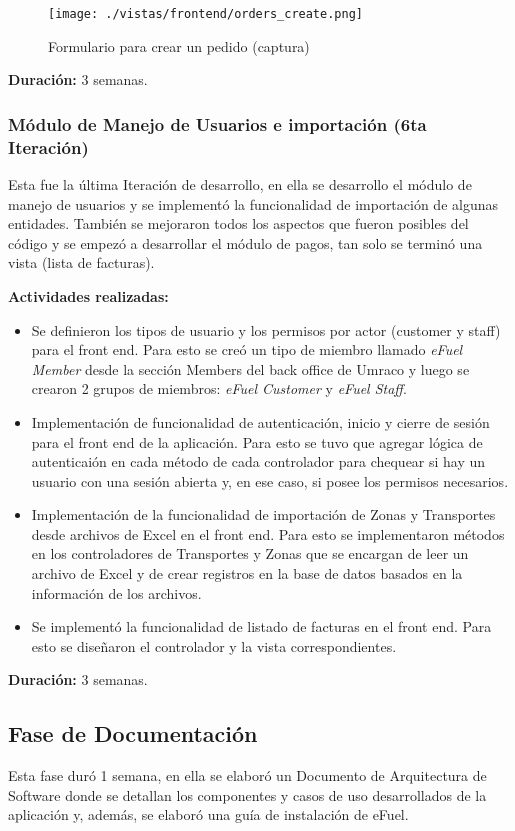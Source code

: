 \begin{figure}[H]
    \centering
    \texttt{[image: ./vistas/frontend/orders\_create.png]}
    \caption{Formulario para crear un pedido (captura)}
    \label{fig:ordercreate}
\end{figure}

\textbf{Duración:} 3 semanas.

\subsubsection{Módulo de Manejo de Usuarios e importación (6ta Iteración)}
Esta fue la última Iteración de desarrollo, en ella se desarrollo el módulo de manejo de usuarios y se implementó la funcionalidad de importación de algunas entidades. También se mejoraron todos los aspectos que fueron posibles del código y se empezó a desarrollar el módulo de pagos, tan solo se terminó una vista (lista de facturas).

\vspace{0.3cm}
\textbf{Actividades realizadas:}
\begin{itemize}
    \item Se definieron los tipos de usuario y los permisos por actor (customer y staff) para el front end. Para esto se creó un tipo de miembro llamado \emph{eFuel Member} desde la sección Members del back office de Umraco y luego se crearon 2 grupos de miembros: \emph{eFuel Customer} y \emph{eFuel Staff}.
    \item Implementación de funcionalidad de autenticación, inicio y cierre de sesión para el front end de la aplicación. Para esto se tuvo que agregar lógica de autenticaión en cada método de cada controlador para chequear si hay un usuario con una sesión abierta y, en ese caso, si posee los permisos necesarios.
    \item Implementación de la funcionalidad de importación de Zonas y Transportes desde archivos de Excel en el front end. Para esto se implementaron métodos en los controladores de Transportes y Zonas que se encargan de leer un archivo de Excel y de crear registros en la base de datos basados en la información de los archivos.
    \item Se implementó la funcionalidad de listado de facturas en el front end. Para esto se diseñaron el controlador y la vista correspondientes.
\end{itemize}

\textbf{Duración:} 3 semanas.

\subsection{Fase de Documentación} \label{documentation}
Esta fase duró 1 semana, en ella se elaboró un Documento de Arquitectura de Software donde se detallan los componentes y casos de uso desarrollados de la aplicación y, además, se elaboró una guía de instalación de eFuel.

